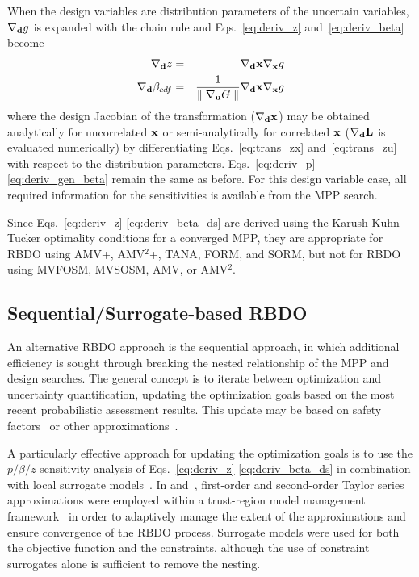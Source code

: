 When the design variables are distribution parameters of the uncertain
variables, $\nabla_{\bf d} g$ is expanded with the chain rule and
Eqs.~\ref{eq:deriv_z} and~\ref{eq:deriv_beta} become
\begin{eqnarray}
\nabla_{\bf d} z           & = & \nabla_{\bf d} {\bf x} \nabla_{\bf x} g
\label{eq:deriv_z_ds} \\
\nabla_{\bf d} \beta_{cdf} & = & \frac{1}{{\parallel \nabla_{\bf u} G 
\parallel}} \nabla_{\bf d} {\bf x} \nabla_{\bf x} g \label{eq:deriv_beta_ds}
\end{eqnarray}
where the design Jacobian of the transformation ($\nabla_{\bf d} {\bf x}$)
may be obtained analytically for uncorrelated ${\bf x}$ or 
semi-analytically for correlated ${\bf x}$ ($\nabla_{\bf d} {\bf L}$
is evaluated numerically) by differentiating Eqs.~\ref{eq:trans_zx} 
and~\ref{eq:trans_zu} with respect to the distribution parameters.
Eqs.~\ref{eq:deriv_p}-\ref{eq:deriv_gen_beta} remain the same as
before.  For this design variable case, all required information for 
the sensitivities is available from the MPP search.

Since Eqs.~\ref{eq:deriv_z}-\ref{eq:deriv_beta_ds} are derived using
the Karush-Kuhn-Tucker optimality conditions for a converged MPP, they
are appropriate for RBDO using AMV+, AMV$^2$+, TANA, FORM, and SORM,
but not for RBDO using MVFOSM, MVSOSM, AMV, or AMV$^2$.


\subsection{Sequential/Surrogate-based RBDO} \label{ouu:rbdo:surr}

An alternative RBDO approach is the sequential approach, in which
additional efficiency is sought through breaking the nested
relationship of the MPP and design searches.  The general concept is
to iterate between optimization and uncertainty quantification,
updating the optimization goals based on the most recent probabilistic
assessment results.  This update may be based on safety
factors~\cite{Wu01} or other approximations~\cite{Du04}.

A particularly effective approach for updating the optimization goals
is to use the $p/\beta/z$ sensitivity analysis of
Eqs.~\ref{eq:deriv_z}-\ref{eq:deriv_beta_ds} in combination with local
surrogate models~\cite{Zou04}.  In \cite{Eld05} and~\cite{Eld06a},
first-order and second-order Taylor series approximations were
employed within a trust-region model management framework~\cite{Giu00}
in order to adaptively manage the extent of the approximations and
ensure convergence of the RBDO process.  Surrogate models were used
for both the objective function and the constraints, although the use
of constraint surrogates alone is sufficient to remove the nesting.

